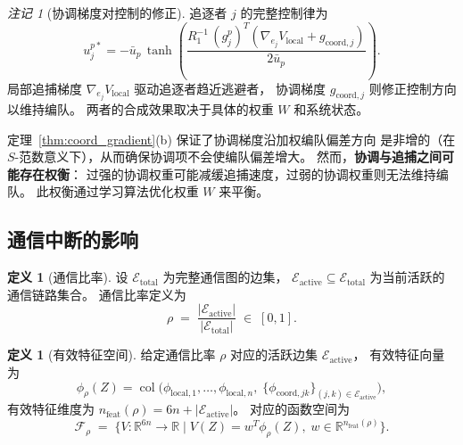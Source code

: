 \documentclass[a4paper,11pt]{article}
\theoremstyle{plain}
\theoremstyle{definition}
\newtheorem{definition}[theorem]{定义}
\theoremstyle{remark}
\newtheorem{remark}[theorem]{注记}
\DeclareMathOperator{\col}{col}
\newcommand{\R}{\mathbb{R}}
\newcommand{\cE}{\mathcal{E}}
\newcommand{\cF}{\mathcal{F}}
\newcommand{\abs}[1]{\lvert #1 \rvert}
\begin{document}
\begin{remark}[协调梯度对控制的修正]\label{rmk:control_modification}
  追逐者 $j$ 的完整控制律为
  \begin{equation}\label{eq:full_control}
    u_j^{p*} = -\bar{u}_p\, \tanh\!\left(
      \frac{R_1^{-1}\, (g_j^p)^T
      (\nabla_{e_j} V_{\text{local}} + g_{\text{coord},j})}
      {2\bar{u}_p}
    \right).
  \end{equation}
  局部追捕梯度 $\nabla_{e_j} V_{\text{local}}$ 驱动追逐者趋近逃避者，
  协调梯度 $g_{\text{coord},j}$ 则修正控制方向以维持编队。
  两者的合成效果取决于具体的权重 $W$ 和系统状态。

  定理~\ref{thm:coord_gradient}(b) 保证了协调梯度沿加权编队偏差方向
  是非增的（在 $S$-范数意义下），从而确保协调项不会使编队偏差增大。
  然而，\textbf{协调与追捕之间可能存在权衡}：
  过强的协调权重可能减缓追捕速度，过弱的协调权重则无法维持编队。
  此权衡通过学习算法优化权重 $W$ 来平衡。
\end{remark}

\subsection{通信中断的影响}

\begin{definition}[通信比率]\label{def:comm_ratio}
  设 $\cE_{\text{total}}$ 为完整通信图的边集，
  $\cE_{\text{active}} \subseteq \cE_{\text{total}}$ 为当前活跃的通信链路集合。
  通信比率定义为
  \begin{equation}\label{eq:comm_ratio}
    \rho \;=\; \frac{\abs{\cE_{\text{active}}}}{\abs{\cE_{\text{total}}}}
    \;\in\; [0,1].
  \end{equation}
\end{definition}

\begin{definition}[有效特征空间]\label{def:eff_feat}
  给定通信比率 $\rho$ 对应的活跃边集 $\cE_{\text{active}}$，
  有效特征向量为
  \begin{equation}\label{eq:phi_eff}
    \phi_\rho(Z) = \col\!\bigl(
      \phi_{\text{local},1},\dots,\phi_{\text{local},n},\;
      \{\phi_{\text{coord},jk}\}_{(j,k)\in\cE_{\text{active}}}
    \bigr),
  \end{equation}
  有效特征维度为 $n_{\text{feat}}(\rho) = 6n + \abs{\cE_{\text{active}}}$。
  对应的函数空间为
  \begin{equation}\label{eq:F_rho}
    \cF_\rho \;=\; \bigl\{
      V: \R^{6n}\to\R \;\big|\;
      V(Z) = w^T \phi_\rho(Z),\; w \in \R^{n_{\text{feat}}(\rho)}
    \bigr\}.
  \end{equation}
\end{definition}
\end{document}
